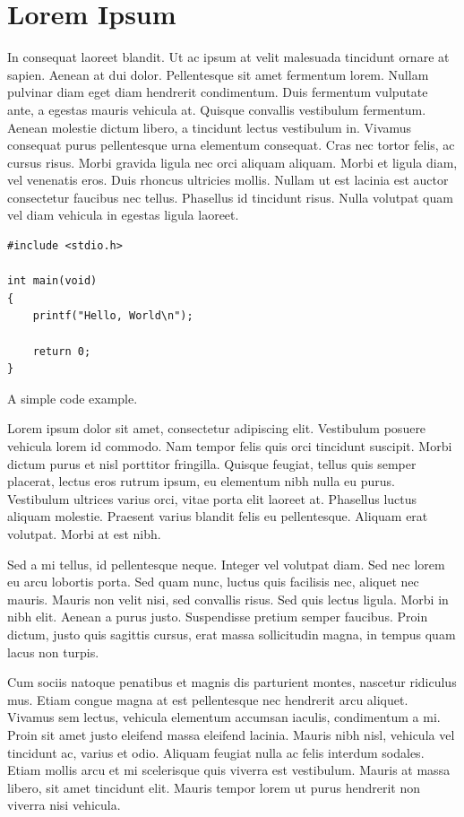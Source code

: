 \section{Lorem Ipsum}

In consequat laoreet blandit. Ut ac ipsum at velit malesuada tincidunt ornare at sapien. Aenean at dui dolor. Pellentesque sit amet fermentum lorem. Nullam pulvinar diam eget diam hendrerit condimentum. Duis fermentum vulputate ante, a egestas mauris vehicula at. Quisque convallis vestibulum fermentum. Aenean molestie dictum libero, a tincidunt lectus vestibulum in. Vivamus consequat purus pellentesque urna elementum consequat. Cras nec tortor felis, ac cursus risus. Morbi gravida ligula nec orci aliquam aliquam. Morbi et ligula diam, vel venenatis eros. Duis rhoncus ultricies mollis. Nullam ut est lacinia est auctor consectetur faucibus nec tellus. Phasellus id tincidunt risus. Nulla volutpat quam vel diam vehicula in egestas ligula laoreet. 

\begin{listing}[t]
\begin{lstlisting}
#include <stdio.h>

int main(void)
{
	printf("Hello, World\n");

	return 0;
}
\end{lstlisting}
\caption{A simple code example.}
\label{lst:example}
\end{listing}

Lorem ipsum dolor sit amet, consectetur adipiscing elit. Vestibulum posuere vehicula lorem id commodo. Nam tempor felis quis orci tincidunt suscipit. Morbi dictum purus et nisl porttitor fringilla. Quisque feugiat, tellus quis semper placerat, lectus eros rutrum ipsum, eu elementum nibh nulla eu purus. Vestibulum ultrices varius orci, vitae porta elit laoreet at. Phasellus luctus aliquam molestie. Praesent varius blandit felis eu pellentesque. Aliquam erat volutpat. Morbi at est nibh.

Sed a mi tellus, id pellentesque neque. Integer vel volutpat diam. Sed nec lorem eu arcu lobortis porta. Sed quam nunc, luctus quis facilisis nec, aliquet nec mauris. Mauris non velit nisi, sed convallis risus. Sed quis lectus ligula. Morbi in nibh elit. Aenean a purus justo. Suspendisse pretium semper faucibus. Proin dictum, justo quis sagittis cursus, erat massa sollicitudin magna, in tempus quam lacus non turpis.

Cum sociis natoque penatibus et magnis dis parturient montes, nascetur ridiculus mus. Etiam congue magna at est pellentesque nec hendrerit arcu aliquet. Vivamus sem lectus, vehicula elementum accumsan iaculis, condimentum a mi. Proin sit amet justo eleifend massa eleifend lacinia. Mauris nibh nisl, vehicula vel tincidunt ac, varius et odio. Aliquam feugiat nulla ac felis interdum sodales. Etiam mollis arcu et mi scelerisque quis viverra est vestibulum. Mauris at massa libero, sit amet tincidunt elit. Mauris tempor lorem ut purus hendrerit non viverra nisi vehicula.

